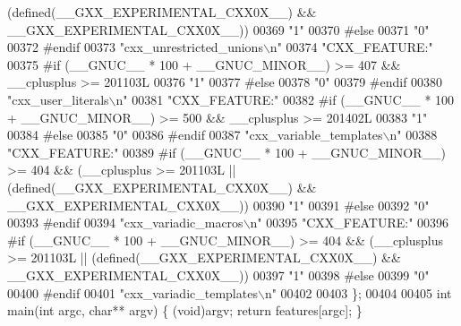 \begin{DoxyCode}
{       (defined(\_\_GXX\_EXPERIMENTAL\_CXX0X\_\_) && \_\_GXX\_EXPERIMENTAL\_CXX0X\_\_))}
00369 \textcolor{stringliteral}{"1"}
00370 \textcolor{preprocessor}{#else}
00371 \textcolor{stringliteral}{"0"}
00372 \textcolor{preprocessor}{#endif}
00373 \textcolor{stringliteral}{"cxx\_unrestricted\_unions\(\backslash\)n"}
00374 \textcolor{stringliteral}{"CXX\_FEATURE:"}
00375 \textcolor{preprocessor}{#if (\_\_GNUC\_\_ * 100 + \_\_GNUC\_MINOR\_\_) >= 407 && \_\_cplusplus >= 201103L}
00376 \textcolor{stringliteral}{"1"}
00377 \textcolor{preprocessor}{#else}
00378 \textcolor{stringliteral}{"0"}
00379 \textcolor{preprocessor}{#endif}
00380 \textcolor{stringliteral}{"cxx\_user\_literals\(\backslash\)n"}
00381 \textcolor{stringliteral}{"CXX\_FEATURE:"}
00382 \textcolor{preprocessor}{#if (\_\_GNUC\_\_ * 100 + \_\_GNUC\_MINOR\_\_) >= 500 && \_\_cplusplus >= 201402L}
00383 \textcolor{stringliteral}{"1"}
00384 \textcolor{preprocessor}{#else}
00385 \textcolor{stringliteral}{"0"}
00386 \textcolor{preprocessor}{#endif}
00387 \textcolor{stringliteral}{"cxx\_variable\_templates\(\backslash\)n"}
00388 \textcolor{stringliteral}{"CXX\_FEATURE:"}
00389 \textcolor{preprocessor}{#if (\_\_GNUC\_\_ * 100 + \_\_GNUC\_MINOR\_\_) >= 404 && (\_\_cplusplus >= 201103L ||
       (defined(\_\_GXX\_EXPERIMENTAL\_CXX0X\_\_) && \_\_GXX\_EXPERIMENTAL\_CXX0X\_\_))}
00390 \textcolor{stringliteral}{"1"}
00391 \textcolor{preprocessor}{#else}
00392 \textcolor{stringliteral}{"0"}
00393 \textcolor{preprocessor}{#endif}
00394 \textcolor{stringliteral}{"cxx\_variadic\_macros\(\backslash\)n"}
00395 \textcolor{stringliteral}{"CXX\_FEATURE:"}
00396 \textcolor{preprocessor}{#if (\_\_GNUC\_\_ * 100 + \_\_GNUC\_MINOR\_\_) >= 404 && (\_\_cplusplus >= 201103L ||
       (defined(\_\_GXX\_EXPERIMENTAL\_CXX0X\_\_) && \_\_GXX\_EXPERIMENTAL\_CXX0X\_\_))}
00397 \textcolor{stringliteral}{"1"}
00398 \textcolor{preprocessor}{#else}
00399 \textcolor{stringliteral}{"0"}
00400 \textcolor{preprocessor}{#endif}
00401 \textcolor{stringliteral}{"cxx\_variadic\_templates\(\backslash\)n"}
00402 
00403 \};
00404 
00405 \textcolor{keywordtype}{int} main(\textcolor{keywordtype}{int} argc, \textcolor{keywordtype}{char}** argv) \{ (void)argv; \textcolor{keywordflow}{return} features[argc]; \}
\end{DoxyCode}
